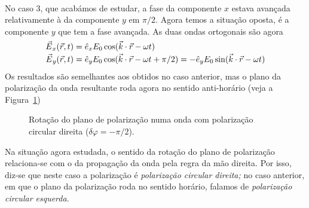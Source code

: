 \begin{description}[leftmargin=0pt,labelindent=0pt]
\item[Caso 4, $\bm{\delta\varphi=-\pi/2}$]\hfill\\
No caso 3, que acabámos de estudar, a fase da componente $x$ estava avançada
relativamente à da componente $y$ em $\pi/2$. Agora temos a situação oposta, é a
componente $y$ que tem a fase avançada. As duas ondas ortogonais são agora
\begin{equation*}
\begin{aligned}
\vec E_x(\vec r,t)&=\he_x E_0\cos(\vec k\cdot\vec r-\omega t)\\
\vec E_y(\vec r,t)&=\he_y E_0\cos(\vec k\cdot\vec r-\omega t + \pi/2)=
-\he_y E_0\sin(\vec k\cdot\vec r-\omega t)
\end{aligned}
\end{equation*}
Os resultados são semelhantes aos obtidos no caso anterior, mas o plano da
polarização da onda resultante roda agora no sentido anti-horário (veja a
Figura~\ref{fig:circpolR})
\begin{figure}[htb]
{\centering
\def\zangle{210}
\def\xangle{-20}
\par
}
\caption{Rotação do plano de polarização numa onda com polarização circular
direita ($\delta\varphi=-\pi/2$).  \label{fig:circpolR}}
\end{figure}
Na situação agora estudada, o sentido da rotação do plano de polarização
relaciona-se com o da propagação da onda pela regra da mão direita. Por isso,
diz-se que neste caso a polarização é \emph{polarização circular direita;} no
caso anterior, em que o plano da polarização roda no sentido horário, falamos de
\emph{polarização circular esquerda.}


\end{description}
